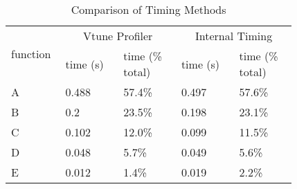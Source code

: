 \begin{table}[H]
\begin{center}
\begin{tabular}{|m{0.1\linewidth}|m{0.18\linewidth}|m{0.18\linewidth}|m{0.18\linewidth}|m{0.18\linewidth}|}
\hline
\multirow{2}{*}{function} & \multicolumn{2}{c|}{Vtune Profiler} & \multicolumn{2}{c|}{Internal Timing} \\
\cline{2-5}
            & time (s)  & time (\% total) & time (s) & time (\% total)    \\
\hline
A       & 0.488     & 57.4\%        & 0.497 & 57.6\%           \\
B       & 0.2       & 23.5\%        & 0.198 & 23.1\%           \\
C       & 0.102     & 12.0\%        & 0.099 & 11.5\%           \\
D       & 0.048     & 5.7\%         & 0.049 & 5.6\%            \\
E       & 0.012     & 1.4\%         & 0.019 & 2.2\%            \\
\hline
\end{tabular}
\end{center}
\caption{Comparison of Timing Methods}
\label{table:timing_calibration}
\end{table}